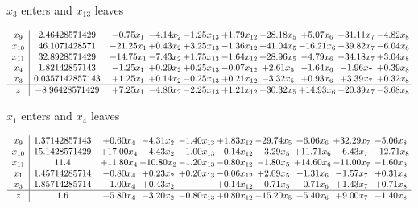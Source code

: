 \documentclass[9pt]{article}
\begin{document}
 $ x_{3} $ enters and $ x_{13} $ leaves 

 \[\begin{array}{c| c c@{\hskip 2pt} c@{\hskip 2pt} c@{\hskip 2pt} c@{\hskip 2pt} c@{\hskip 2pt} c@{\hskip 2pt} c@{\hskip 2pt} c@{\hskip 2pt} }
 x_{9}   &  2.46428571429 & -0.75 x_{1} & -4.14 x_{2} & -1.25 x_{13} & +  1.79 x_{12} & -28.18 x_{5} & +  5.07 x_{6} & + 31.11 x_{7} & -4.82 x_{8}\\
 x_{10}   &  46.1071428571 & -21.25 x_{1} & +  0.43 x_{2} & +  3.25 x_{13} & -1.36 x_{12} & + 41.04 x_{5} & -16.21 x_{6} & -39.82 x_{7} & -6.04 x_{8}\\
 x_{11}   &  32.8928571429 & -14.75 x_{1} & -7.43 x_{2} & +  1.75 x_{13} & -1.64 x_{12} & + 28.96 x_{5} & -4.79 x_{6} & -34.18 x_{7} & +  3.04 x_{8}\\
 x_{4}   &  1.82142857143 & -1.25 x_{1} & +  0.29 x_{2} & +  0.25 x_{13} & -0.07 x_{12} & +  2.61 x_{5} & -1.64 x_{6} & -1.96 x_{7} & +  0.39 x_{8}\\
 x_{3}   &  0.0357142857143 & +  1.25 x_{1} & +  0.14 x_{2} & -0.25 x_{13} & +  0.21 x_{12} & -3.32 x_{5} & +  0.93 x_{6} & +  3.39 x_{7} & +  0.32 x_{8}\\
\hline
z    &  -8.96428571429 & +  7.25 x_{1} & -4.86 x_{2} & -2.25 x_{13} & +  1.21 x_{12} & -30.32 x_{5} & + 14.93 x_{6} & + 20.39 x_{7} & -3.68 x_{8}\\
\end{array}\]


 $ x_{1} $ enters and $ x_{4} $ leaves 

 \[\begin{array}{c| c c@{\hskip 2pt} c@{\hskip 2pt} c@{\hskip 2pt} c@{\hskip 2pt} c@{\hskip 2pt} c@{\hskip 2pt} c@{\hskip 2pt} c@{\hskip 2pt} }
 x_{9}   &  1.37142857143 & +  0.60 x_{4} & -4.31 x_{2} & -1.40 x_{13} & +  1.83 x_{12} & -29.74 x_{5} & +  6.06 x_{6} & + 32.29 x_{7} & -5.06 x_{8}\\
 x_{10}   &  15.1428571429 & + 17.00 x_{4} & -4.43 x_{2} & -1.00 x_{13} & -0.14 x_{12} & -3.29 x_{5} & + 11.71 x_{6} & -6.43 x_{7} & -12.71 x_{8}\\
 x_{11}   &  11.4 & + 11.80 x_{4} & -10.80 x_{2} & -1.20 x_{13} & -0.80 x_{12} & -1.80 x_{5} & + 14.60 x_{6} & -11.00 x_{7} & -1.60 x_{8}\\
 x_{1}   &  1.45714285714 & -0.80 x_{4} & +  0.23 x_{2} & +  0.20 x_{13} & -0.06 x_{12} & +  2.09 x_{5} & -1.31 x_{6} & -1.57 x_{7} & +  0.31 x_{8}\\
 x_{3}   &  1.85714285714 & -1.00 x_{4} & +  0.43 x_{2} &   & +  0.14 x_{12} & -0.71 x_{5} & -0.71 x_{6} & +  1.43 x_{7} & +  0.71 x_{8}\\
\hline
z    &  1.6 & -5.80 x_{4} & -3.20 x_{2} & -0.80 x_{13} & +  0.80 x_{12} & -15.20 x_{5} & +  5.40 x_{6} & +  9.00 x_{7} & -1.40 x_{8}\\
\end{array}\]
\end{document}
